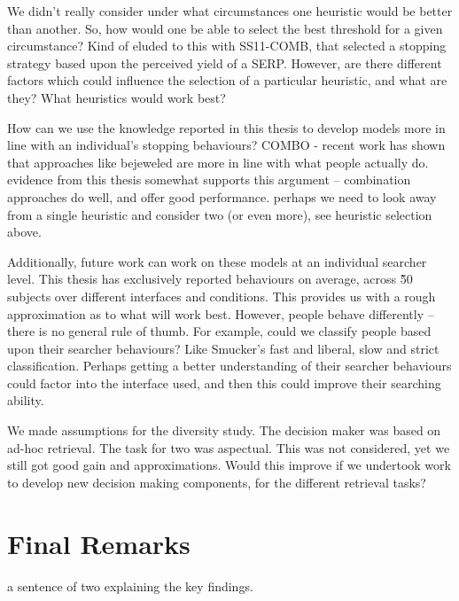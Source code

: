 We didn't really consider under what circumstances one heuristic would be better than another. So, how would one be able to select the best threshold for a given circumstance? Kind of eluded to this with SS11-COMB, that selected a stopping strategy based upon the perceived yield of a SERP. However, are there different factors which could influence the selection of a particular heuristic, and what are they? What heuristics would work best?

How can we use the knowledge reported in this thesis to develop models more in line with an individual's stopping behaviours?
COMBO - recent work has shown that approaches like bejeweled are more in line with what people actually do. evidence from this thesis somewhat supports this argument -- combination approaches do well, and offer good performance. perhaps we need to look away from a single heuristic and consider two (or even more), see heuristic selection above.

Additionally, future work can work on these models at an individual searcher level. This thesis has exclusively reported behaviours on average, across \~50 subjects over different interfaces and conditions. This provides us with a rough approximation as to what will work best. However, people behave differently -- there is no general rule of thumb. For example, could we classify people based upon their searcher behaviours? Like Smucker's fast and liberal, slow and strict classification. Perhaps getting a better understanding of their searcher behaviours could factor into the interface used, and then this could improve their searching ability.

We made assumptions for the diversity study. The decision maker was based on ad-hoc retrieval.
The task for two was aspectual. This was not considered, yet we still got good gain and approximations. Would this improve if we undertook work to develop new decision making components, for the different retrieval tasks?


\section{Final Remarks}
a sentence of two explaining the key findings.



